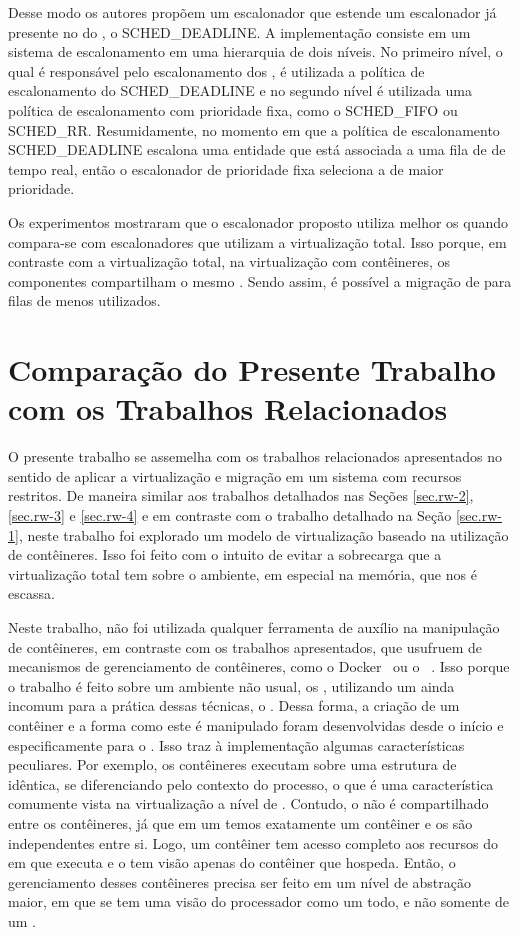 Desse modo os autores propõem um escalonador que estende um escalonador já presente no  do \linux, o SCHED\_DEADLINE. A implementação consiste em um sistema de escalonamento em uma hierarquia de dois níveis. No primeiro nível, o qual é responsável pelo escalonamento dos \cgroups, é utilizada a política de escalonamento do SCHED\_DEADLINE e no segundo nível é utilizada uma política de escalonamento com prioridade fixa, como o SCHED\_FIFO ou SCHED\_RR.
Resumidamente, no momento em que a política de escalonamento SCHED\_DEADLINE escalona uma entidade que está associada a uma fila de \tasks de tempo real, então o escalonador de prioridade fixa seleciona a \task de maior prioridade.

Os experimentos mostraram que o escalonador proposto utiliza melhor os \cores quando compara-se com escalonadores que utilizam a virtualização total. Isso porque, em contraste com a virtualização total, na virtualização com contêineres, os componentes compartilham o mesmo . Sendo assim, é possível a migração de \tasks para filas de \cores menos utilizados.

\section{Comparação do Presente Trabalho com os Trabalhos Relacionados}

O presente trabalho se assemelha com os trabalhos relacionados apresentados no sentido de aplicar a virtualização e migração em um sistema com recursos restritos. De maneira similar aos trabalhos detalhados nas Seções \ref{sec.rw-2}, \ref{sec.rw-3} e \ref{sec.rw-4} e em contraste com o trabalho detalhado na Seção \ref{sec.rw-1}, neste trabalho foi explorado um modelo de virtualização baseado na utilização de contêineres. Isso foi feito com o intuito de evitar a sobrecarga que a virtualização total tem sobre o ambiente, em especial na memória, que nos \lws é escassa.

Neste trabalho, não foi utilizada qualquer ferramenta de auxílio na manipulação de contêineres, em contraste com os trabalhos apresentados, que usufruem de mecanismos de gerenciamento de contêineres, como o Docker~\cite{smartcarslwvirtualization,karhula2019checkpointing} ou o \lxc~\cite{abeni2019container}. Isso porque o trabalho é feito sobre um ambiente não usual, os \lws, utilizando um \so ainda incomum para a prática dessas técnicas, o \nanvix. Dessa forma, a criação de um contêiner e a forma como este é manipulado foram desenvolvidas desde o início e especificamente para o \nanvix. Isso traz à implementação algumas características peculiares. Por exemplo, os contêineres executam sobre uma estrutura de  idêntica, se diferenciando pelo contexto do processo, o que é uma característica comumente vista na virtualização a nível de \so. Contudo, o  não é compartilhado entre os contêineres, já que em um \cluster temos exatamente um contêiner e os \clusters são independentes entre si. Logo, um contêiner tem acesso completo aos recursos do \cluster em que executa e o \cluster tem visão apenas do contêiner que hospeda. Então, o gerenciamento desses contêineres precisa ser feito em um nível de abstração maior, em que se tem uma visão do processador como um todo, e não somente de um \cluster.

